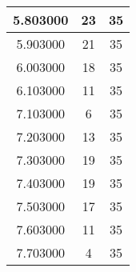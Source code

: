 \begin{longtable}[htbp]{|c|c|c|}
5.803000 & 23 & 35 \\ \hline
5.903000 & 21 & 35 \\ \hline
6.003000 & 18 & 35 \\ \hline
6.103000 & 11 & 35 \\ \hline
7.103000 & 6 & 35 \\ \hline
7.203000 & 13 & 35 \\ \hline
7.303000 & 19 & 35 \\ \hline
7.403000 & 19 & 35 \\ \hline
7.503000 & 17 & 35 \\ \hline
7.603000 & 11 & 35 \\ \hline
7.703000 & 4 & 35 \\ \hline
\end{longtable}
